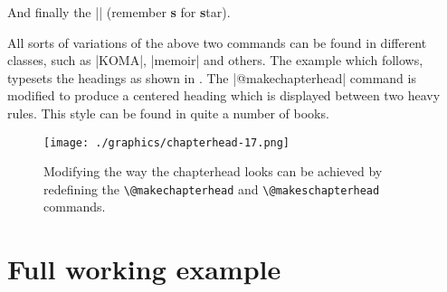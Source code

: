 \begin{teXXX}
\def\@schapter#1{\if@twocolumn
                   \@topnewpage[\@makeschapterhead{#1}]%
                 \else
                   \@makeschapterhead{#1}%
                   \@afterheading
                 \fi}
\end{teXXX}

And finally the |\@makeschapterhead| (remember \textbf{s} for \textbf{s}tar).

\begin{teXXX}
\def\@makeschapterhead#1{%
  \vspace*{50\p@}%
  {\parindent \z@ \raggedright
    \normalfont
    \interlinepenalty\@M
    \Huge \bfseries  #1\par\nobreak
    \vskip 40\p@
  }}
\end{teXXX}

All sorts of variations of the above two commands can be found in different classes, such as |KOMA|, |memoir| and others. The example which follows, typesets the headings as shown in . The |@makechapterhead| command is modified to produce a centered heading which is displayed between two heavy rules. This style can be found in quite a number of books.

\begin{figure*}[htbp]
\texttt{[image: ./graphics/chapterhead-17.png]}
\caption{Modifying the way the chapterhead looks can be achieved by redefining the \texttt{\textbackslash @makechapterhead} and \texttt{\textbackslash @makeschapterhead} commands.}
\label{fig:chapterhead-17}
\end{figure*}

\section*{Full working example}

